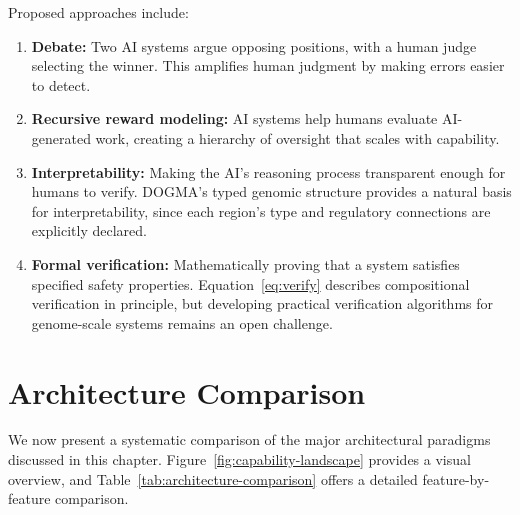 Proposed approaches include:

\begin{enumerate}[leftmargin=1.8em]
  \item \textbf{Debate:} Two AI systems argue opposing positions, with a human judge selecting the winner. This amplifies human judgment by making errors easier to detect.
  \item \textbf{Recursive reward modeling:} AI systems help humans evaluate AI-generated work, creating a hierarchy of oversight that scales with capability.
  \item \textbf{Interpretability:} Making the AI's reasoning process transparent enough for humans to verify. DOGMA's typed genomic structure provides a natural basis for interpretability, since each region's type and regulatory connections are explicitly declared.
  \item \textbf{Formal verification:} Mathematically proving that a system satisfies specified safety properties. Equation~\ref{eq:verify} describes compositional verification in principle, but developing practical verification algorithms for genome-scale systems remains an open challenge.
\end{enumerate}

\section{Architecture Comparison}
\label{sec:comparison}

We now present a systematic comparison of the major architectural paradigms discussed in this chapter. Figure~\ref{fig:capability-landscape} provides a visual overview, and Table~\ref{tab:architecture-comparison} offers a detailed feature-by-feature comparison.


